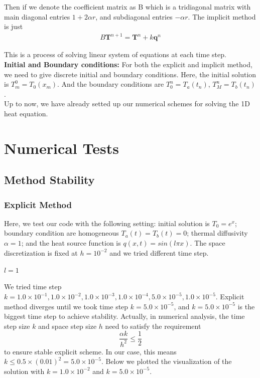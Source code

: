 \documentclass[a4paper,12pt]{article}
\begin{document}
Then if we denote the coefficient matrix as B which is a tridiagonal matrix with main diagonal entries \(1 + 2\alpha r\), and subdiagonal entries \(-\alpha r\). The implicit method is just
\begin{eqnarray}
B\textbf{T}^{n+1} = \textbf{T}^{n} + k\textbf{q}^{n}
\end{eqnarray}

This is a process of solving linear system of equations at each time step. \\

\textbf{Initial and Boundary conditions:} For both the explicit and implicit method, we need to give discrete initial and boundary conditions. Here, the initial solution is
\(T_{m}^{0} = T_{0}(x_{m})\). And the boundary conditions are \(T_{0}^{n} = T_{a}(t_{n})\), \(T_{M}^{n} = T_{b}(t_{n})\).\\

Up to now, we have already setted up our numerical schemes for solving the 1D heat equation. \\
\newpage
\section{Numerical Tests}
\subsection{Method Stability}
\subsubsection{Explicit Method}
Here, we test our code with the following setting: initial solution is \(T_{0} = e^{x}\); boundary condition are homogeneous \(T_{a}(t) = T_{b}(t) = 0\); thermal diffusivity \(\alpha = 1\); and the heat source function is \(q(x,t) = sin(l \pi x)\). The space discretization is fixed at \(h = 10^{-2}\) and we tried different time step. 
\paragraph{\(l=1\)}
We tried time step \(k = 1.0 \times 10^{-1}, 1.0\times 10^{-2}, 1.0\times 10^{-3}, 1.0\times 10^{-4}, 5.0\times 10^{-5}, 1.0\times 10^{-5}\). Explicit method diverges until we took time step \(k=5.0\times 10^{-5}\), and \(k=5.0\times 10^{-5}\) is the biggest time step to achieve stability. Actually, in numerical analysis, the time step size \(k\) and space step size \(h\) need to satisfy the requirement 
\[\frac{\alpha k}{h^{2}} \leq \frac{1}{2}\]
to ensure stable explicit scheme. In our case, this means \(k \leq 0.5 \times (0.01)^{2} = 5.0\times  10^{-5}\). Below we plotted the visualization of the solution with \(k = 1.0\times 10^{-2}\) and \(k = 5.0\times 10^{-5}\).
\end{document}
